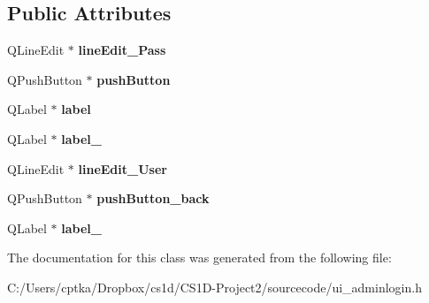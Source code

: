 \subsection*{Public Attributes}
\begin{DoxyCompactItemize}
\item 
\mbox{\label{class_ui__admin_login_a60e2b28ba995219be329de77bffd2510}} 
Q\+Line\+Edit $\ast$ {\bfseries line\+Edit\+\_\+\+Pass}
\item 
\mbox{\label{class_ui__admin_login_a190de661e21bc7e99eef24774a2f0ef9}} 
Q\+Push\+Button $\ast$ {\bfseries push\+Button}
\item 
\mbox{\label{class_ui__admin_login_aa057f29fe6d99056b79cb061a36183a5}} 
Q\+Label $\ast$ {\bfseries label}
\item 
\mbox{\label{class_ui__admin_login_a1e16bd34bb34ff77d43bcc721eff7740}} 
Q\+Label $\ast$ {\bfseries label\+\_}
\item 
\mbox{\label{class_ui__admin_login_a8ba430a94e0fae798e685b2ffebd5f88}} 
Q\+Line\+Edit $\ast$ {\bfseries line\+Edit\+\_\+\+User}
\item 
\mbox{\label{class_ui__admin_login_a38af97e90a7d9756215863fd3e1f0d2b}} 
Q\+Push\+Button $\ast$ {\bfseries push\+Button\+\_\+back}
\item 
\mbox{\label{class_ui__admin_login_af4b4108097ceb9c24f1149ed00bb3b5a}} 
Q\+Label $\ast$ {\bfseries label\+\_}
\end{DoxyCompactItemize}


The documentation for this class was generated from the following file\+:\begin{DoxyCompactItemize}
\item 
C\+:/\+Users/cptka/\+Dropbox/cs1d/\+C\+S1\+D-\/\+Project2/sourcecode/ui\+\_\+adminlogin.\+h\end{DoxyCompactItemize}
